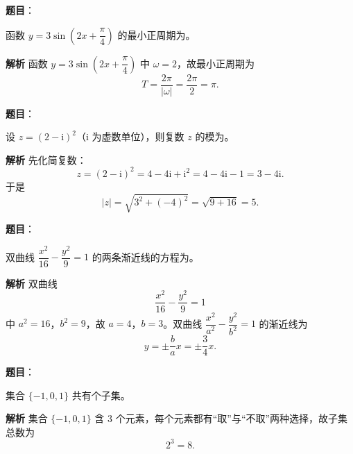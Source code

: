 

\begin{answer}

\textbf{题目}：

函数 $y=3\sin\left(2x+\dfrac{\pi}{4}\right)$ 的最小正周期为\gkblank{}。

\textbf{解析}
函数 $y=3\sin\left(2x+\dfrac{\pi}{4}\right)$ 中 $\omega=2$，故最小正周期为
\nopagebreak[4]
\[T=\frac{2\pi}{|\omega|}=\frac{2\pi}{2}=\pi.\]


\end{answer}
\begin{answer}

\textbf{题目}：

设 $z=(2-\mathrm i)^2$（$\mathrm i$ 为虚数单位），则复数 $z$ 的模为\gkblank{}。

\textbf{解析}
先化简复数：
\nopagebreak[4]
\[z=(2-\mathrm i)^2=4-4\mathrm i+\mathrm i^2=4-4\mathrm i-1=3-4\mathrm i.\]
于是
\nopagebreak[4]
\[|z|=\sqrt{3^2+(-4)^2}=\sqrt{9+16}=5.\]


\end{answer}
\begin{answer}

\textbf{题目}：

双曲线 $\dfrac{x^2}{16}-\dfrac{y^2}{9}=1$ 的两条渐近线的方程为\gkblank{}。

\textbf{解析}
双曲线
\nopagebreak[4]
\[\frac{x^2}{16}-\frac{y^2}{9}=1\]
中 $a^2=16$，$b^2=9$，故 $a=4$，$b=3$。双曲线 $\dfrac{x^2}{a^2}-\dfrac{y^2}{b^2}=1$ 的渐近线为
\nopagebreak[4]
\[y=\pm\frac ba x=\pm\frac34x.\]


\end{answer}
\begin{answer}

\textbf{题目}：

集合 $\{-1,0,1\}$ 共有\gkblank{}个子集。

\textbf{解析}
集合 $\{-1,0,1\}$ 含 $3$ 个元素，每个元素都有“取”与“不取”两种选择，故子集总数为
\nopagebreak[4]
\[2^3=8.\]


\end{answer}
